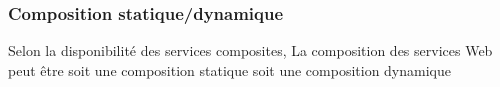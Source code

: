     

    
      \subsubsection{Composition statique/dynamique}
      \label{sec:comp-stat}
      Selon la disponibilité des services composites, La composition
      des services Web peut être soit une composition statique soit
      une composition dynamique

